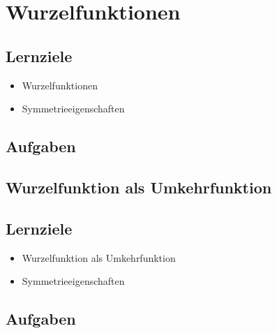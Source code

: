 \section{Wurzelfunktionen}

\subsection*{Lernziele}

\begin{itemize}
\item Wurzelfunktionen
\item Symmetrieeigenschaften
\end{itemize}

\subsection*{Aufgaben}




\newpage

\subsection{Wurzelfunktion als
  Umkehrfunktion}

\subsection*{Lernziele}

\begin{itemize}
\item Wurzelfunktion als Umkehrfunktion
\item Symmetrieeigenschaften
\end{itemize}

\subsection*{Aufgaben}


\newpage
